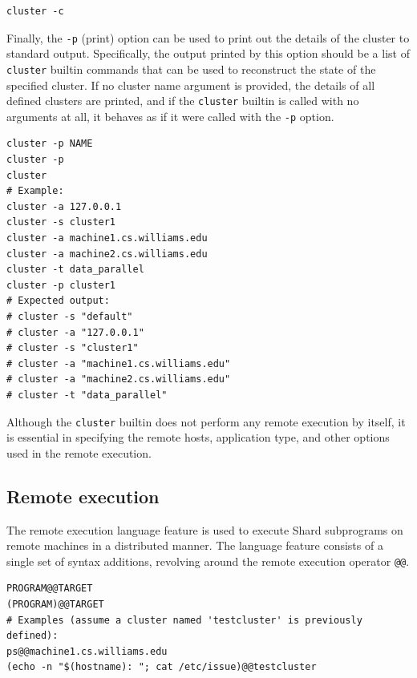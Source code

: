 \documentclass[twoside]{report}
\begin{document}
\begin{minipage}[c]{\textwidth-15pt}
  \begin{lstlisting}[language=Shard]
cluster -c
\end{lstlisting}
  \smallskip
\end{minipage}

Finally, the \texttt{-p} (print) option can be used to print out the details of the cluster to standard output.
Specifically, the output printed by this option should be a list of \texttt{cluster} builtin commands that can be used to reconstruct the state of the specified cluster.
If no cluster name argument is provided, the details of all defined clusters are printed, and if the \texttt{cluster} builtin is called with no arguments at all, it behaves as if it were called with the \texttt{-p} option.

\begin{minipage}[c]{\textwidth-15pt}
  \begin{lstlisting}[language=Shard]
cluster -p NAME
cluster -p
cluster
# Example:
cluster -a 127.0.0.1
cluster -s cluster1
cluster -a machine1.cs.williams.edu
cluster -a machine2.cs.williams.edu
cluster -t data_parallel
cluster -p cluster1
# Expected output:
# cluster -s "default"
# cluster -a "127.0.0.1"
# cluster -s "cluster1"
# cluster -a "machine1.cs.williams.edu"
# cluster -a "machine2.cs.williams.edu"
# cluster -t "data_parallel"
\end{lstlisting}
  \smallskip
\end{minipage}

Although the \texttt{cluster} builtin does not perform any remote execution by itself, it is essential in specifying the remote hosts, application type, and other options used in the remote execution.

\subsection{Remote execution}
The remote execution language feature is used to execute Shard subprograms on remote machines in a distributed manner.
The language feature consists of a single set of syntax additions, revolving around the remote execution operator \texttt{@@}.

\begin{minipage}[c]{\textwidth-15pt}
  \begin{lstlisting}[language=Shard]
PROGRAM@@TARGET
(PROGRAM)@@TARGET
# Examples (assume a cluster named 'testcluster' is previously defined):
ps@@machine1.cs.williams.edu
(echo -n "$(hostname): "; cat /etc/issue)@@testcluster
\end{lstlisting}
  \smallskip
\end{minipage}
\end{document}
